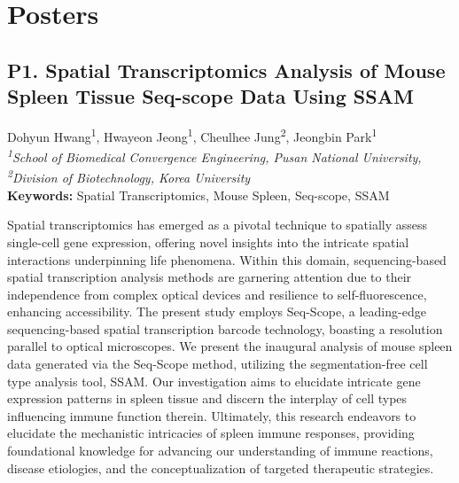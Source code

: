 
\chapter{Posters}


\section*{P1. Spatial Transcriptomics Analysis of Mouse Spleen Tissue Seq-scope Data Using SSAM}

\begin{center}
Dohyun Hwang\textsuperscript{1}, Hwayeon Jeong\textsuperscript{1}, Cheulhee Jung\textsuperscript{2}, Jeongbin Park\href{https://orcid.org/0000-0002-9064-4912}{\textcolor{orcidlogocol}{\aiOrcid}}\textsuperscript{1} \\
\vspace{0.2cm}
\textit{\textsuperscript{1}School of Biomedical Convergence Engineering, Pusan National University, \textsuperscript{2}Division of Biotechnology, Korea University} \\
\vspace{0.2cm}
\textbf{Keywords:} Spatial Transcriptomics, Mouse Spleen, Seq-scope, SSAM
\end{center}

\noindent
Spatial transcriptomics has emerged as a pivotal technique to spatially assess single-cell gene expression, offering novel insights into the intricate spatial interactions underpinning life phenomena. Within this domain, sequencing-based spatial transcription analysis methods are garnering attention due to their independence from complex optical devices and resilience to self-fluorescence, enhancing accessibility. The present study employs Seq-Scope, a leading-edge sequencing-based spatial transcription barcode technology, boasting a resolution parallel to optical microscopes. We present the inaugural analysis of mouse spleen data generated via the Seq-Scope method, utilizing the segmentation-free cell type analysis tool, SSAM. Our investigation aims to elucidate intricate gene expression patterns in spleen tissue and discern the interplay of cell types influencing immune function therein. Ultimately, this research endeavors to elucidate the mechanistic intricacies of spleen immune responses, providing foundational knowledge for advancing our understanding of immune reactions, disease etiologies, and the conceptualization of targeted therapeutic strategies.
\newpage

